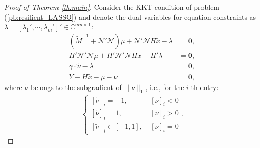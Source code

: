 \documentclass[12pt]{article}  %
\newcommand{\Cb}{{\mathbb{C}}}
\newcommand{\Nc}{{\mathcal{N}}}
\newtheorem*{proof}{\textbf{Proof}}
\begin{document}
	\begin{proof}[Proof of Theorem \ref{th:main}]
	Consider the KKT condition of problem (\ref{pb:resilient_LASSO}) and denote the dual variables for equation constraints as $\lambda=[\lambda_1{'},\cdots,\lambda_m{'}]{'}\in \Cb^{mn\times 1}$:	
	\begin{align}
	(\tilde{M}^{-1}+\Nc{'}\Nc)\mu+\Nc{'} \Nc H\tilde{x} - \lambda &= \mathbf{0}, \label{eq:KKT1}\\
	H{'} \Nc{'}\Nc\mu+H{'} \Nc{'} \Nc H\tilde{x} -  H{'}\lambda &= \mathbf{0}, \label{eq:KKT2} \\
	\gamma \cdot  \tilde{\nu} - \lambda &= \mathbf{0}, \label{eq:KKT3} \\
	{Y} - H \tilde{x} - \mu - \nu &= \mathbf{0},  \label{eq:KKT4}
	\end{align}
	where $\tilde{\nu}$ belongs to the subgradient of $\|\nu\|_1$, i.e., for the $i$-th entry:
	\begin{align*}
	\begin{cases}
	[\tilde{\nu}]_i=-1 ,& \ [\nu]_i<0 \\
	[\tilde{\nu}]_i=1 , &\ [\nu]_i>0  \\
	[\tilde{\nu}]_i\in\left[-1,1\right],& \ [\nu]_i=0 
	\end{cases}.
	\end{align*}
	

\end{proof}
\end{document}
